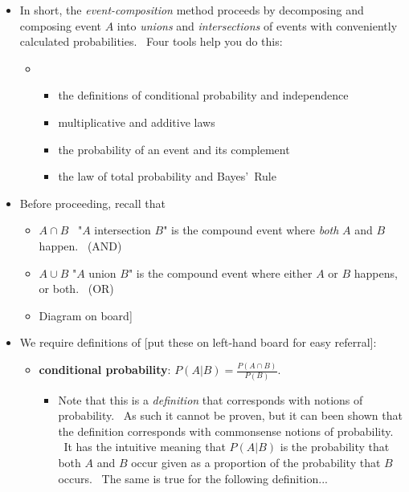 \documentclass[11pt]{article}
\begin{document}
\begin{itemize}
\item In short, the \textit{event-composition} method proceeds by
decomposing and composing event $A$ into \textit{unions} and \textit{%
intersections} of events with conveniently calculated probabilities. \ Four
tools help you do this:

\begin{itemize}
\item 
\begin{itemize}
\item the definitions of conditional probability and independence

\item multiplicative and additive laws

\item the probability of an event and its complement

\item the law of total probability and Bayes'\ Rule
\end{itemize}
\end{itemize}

\item Before proceeding, recall that

\begin{itemize}
\item $A\cap B$ \ "$A$ intersection $B$" is the compound event where \textit{%
both} $A$ and $B$ happen. \ (AND)

\item $A\cup B$ "$A$ union $B$" is the compound event where either $A$ or $B$
happens, or both. \ (OR)

\item \lbrack Diagram on board]
\end{itemize}

\item We require definitions of [put these on left-hand board for easy
referral]:

\begin{itemize}
\item \textbf{conditional probability}: $P(A|B)=\frac{P(A\cap B)}{P(B)}.$

\begin{itemize}
\item Note that this is a \textit{definition }that corresponds with notions
of probability. \ As such it cannot be proven, but it can been shown that
the definition corresponds with commonsense notions of probability. \ It has
the intuitive meaning that $P(A|B)$ is the probability that both $A$ and $B$
occur given as a proportion of the probability that $B$ occurs. \ The same
is true for the following definition...
\end{itemize}


\end{itemize}
\end{itemize}
\end{document}
